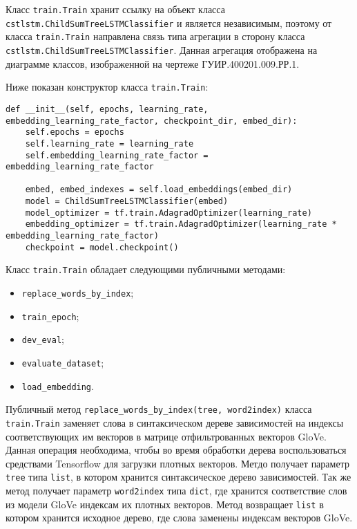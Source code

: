 Класс \texttt{train.Train} хранит ссылку на объект класса \texttt{cstlstm.ChildSumTreeLSTMClassifier} и является независимым, поэтому от класса \texttt{train.Train} направлена связь типа агрегации в сторону класса \texttt{cstlstm.ChildSumTreeLSTMClassifier}. Данная агрегация отображена на диаграмме классов, изображенной на чертеже ГУИР.400201.009.РР.1.

Ниже показан конструктор класса \texttt{train.Train}:

\medskip
\begin{lstlisting}[style=Python]
  def __init__(self, epochs, learning_rate, embedding_learning_rate_factor, checkpoint_dir, embed_dir):
    self.epochs = epochs
    self.learning_rate = learning_rate
    self.embedding_learning_rate_factor = embedding_learning_rate_factor

    embed, embed_indexes = self.load_embeddings(embed_dir)
    model = ChildSumTreeLSTMClassifier(embed)
    model_optimizer = tf.train.AdagradOptimizer(learning_rate)
    embedding_optimizer = tf.train.AdagradOptimizer(learning_rate * embedding_learning_rate_factor)
    checkpoint = model.checkpoint()
\end{lstlisting}
\medskip

Класс \texttt{train.Train} обладает следующими публичными методами:
\begin{itemize}
\item \texttt{replace\_words\_by\_index};
\item \texttt{train\_epoch};
\item \texttt{dev\_eval};
\item \texttt{evaluate\_dataset};
\item \texttt{load\_embedding}.
\end{itemize}

Публичный метод \texttt{replace\_words\_by\_index(tree, word2index)} класса \texttt{train.Train} заменяет слова в синтаксическом дереве зависимостей на индексы соответствующих им векторов в матрице отфильтрованных векторов GloVe. Данная операция необходима, чтобы во время обработки дерева воспользоваться средствами Tensorflow для загрузки плотных векторов.  Метдо получает параметр \texttt{tree} типа \texttt{list}, в котором хранится синтаксическое дерево зависимостей. Так же метод получает параметр \texttt{word2index} типа \texttt{dict}, где хранится соответствие слов из модели GloVe индексам их плотных векторов. Метод возвращает \texttt{list} в котором хранится исходное дерево, где слова заменены индексам векторов GloVe.

